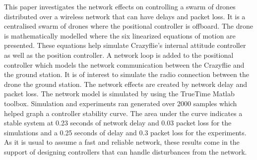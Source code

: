 This paper investigates the network effects on controlling a swarm of drones distributed over a wireless network that can have delays and packet loss. It is a centralised swarm of drones where the positional controller is offboard. The drone is mathematically modelled where the six linearized equations of motion are presented. These equations help simulate Crazyflie's internal attitude controller as well as the position controller. A network loop is added to the positional controller which models the network communication between the Crazyflie and the ground station. It is of interest to simulate the radio connection between the drone the ground station. The network effects are created by network delay and packet loss. The network model is simulated by using the TrueTime Matlab toolbox. Simulation and experiments ran generated over 2000 samples which helped graph a controller stability curve. The area under the curve indicates a stable system at 0.23 seconds of network delay and 0.03 packet loss for the simulations and a 0.25 seconds of delay and 0.3 packet loss for the experiments. As it is usual to assume a fast and reliable network, these results come in the support of designing controllers that can handle disturbances from the network. 